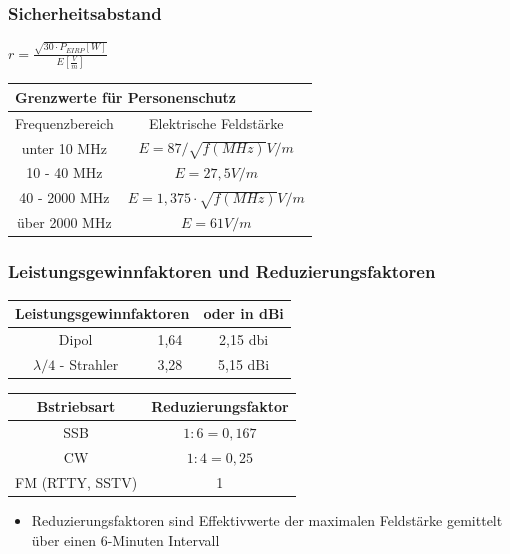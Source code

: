 \begin{frame}
	\frametitle{Sicherheitsabstand}
	\begin{center}
	\begin{LARGE}
		$r = \frac{\sqrt{30 \cdot P_{EIRP}[W]}}{E[\frac{V}{m}]}$
	\end{LARGE}
	\vspace{0.5cm}
	
	\begin{tabular}{|c|c|}
	\hline
	\multicolumn{2}{|l|}{Grenzwerte für Personenschutz} \\ \hline
	Frequenzbereich & Elektrische Feldstärke \\ \hline
	unter 10 MHz & $E = 87 / \sqrt{f(MHz)} V/m$ \\ \hline
	10 - 40 MHz & $E = 27,5 V/m$ \\ \hline
	40 - 2000 MHz & $E = 1,375 \cdot \sqrt{f(MHz)} V/m$ \\ \hline
	über 2000 MHz & $E = 61 V/m$ \\ \hline
	\end{tabular}
	\end{center}
\end{frame}

\begin{frame}
	\frametitle{Leistungsgewinnfaktoren und Reduzierungsfaktoren}
	\begin{tabular}{|c|c|c|}
		\hline
		\multicolumn{2}{|l|}{Leistungsgewinnfaktoren} & oder in dBi \\ \hline
		Dipol & 1,64 & 2,15 dbi \\ \hline
		$\lambda / 4$ - Strahler & 3,28 & 5,15 dBi \\ \hline
	\end{tabular}
	\vspace{0.5cm}
	
	\begin{tabular}{|c|c|}
		\hline
		Bstriebsart & Reduzierungsfaktor \\ \hline
		SSB & $1 : 6 = 0,167$ \\ \hline
		CW & $1 : 4 = 0,25$ \\ \hline
		FM (RTTY, SSTV) & 1 \\ \hline		
	\end{tabular}
	\begin{itemize}
		\item	Reduzierungsfaktoren sind Effektivwerte der maximalen Feldstärke gemittelt über 		einen 6-Minuten Intervall
	\end{itemize}
\end{frame}

